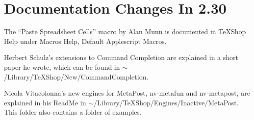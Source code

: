 \documentclass[11pt, oneside]{amsart}
\begin{document}
\section{Documentation Changes In 2.30}

The ``Paste Spreadsheet Cells'' macro by Alan Munn is documented in TeXShop Help under Macros Help, Default Applescript Macros.

Herbert Schulz's extensions to Command Completion are explained in a short paper he wrote, which can be found in $\sim$/Library/TeXShop/New/CommandCompletion.

Nicola Vitacolonna's new engines for MetaPost, nv-metafun and nv-metapost, are explained in his ReadMe in
$\sim$/Library/TeXShop/Engines/Inactive/MetaPost. This folder also contains a folder of examples.



\end{document}
